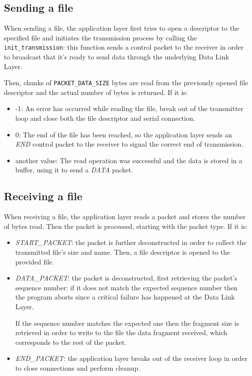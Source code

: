 \documentclass[11pt,a4paper,twocolumn]{article}
\begin{document}
\subsection{Sending a file}

When sending a file, the application layer first tries to open a descriptor to the specified file and initiates the transmission process by calling the \lstinline{init_transmission}: this function sends a control packet to the receiver in order to broadcast that it's ready to send data through the underlying Data Link Layer.

Then, chunks of \lstinline{PACKET_DATA_SIZE} bytes are read from the previously opened file descriptor and the actual number of bytes is returned. If it is:
\begin{itemize}
    \item -1: An error has occurred while reading the file, break out of the transmitter loop and close both the file descriptor and serial connection.

    \item 0: The end of the file has been reached, so the application layer sends an \textit{END} control packet to the receiver to signal the correct end of transmission.

    \item another value: The read operation was successful and the data is stored in a buffer, using it to send a \textit{DATA} packet.
\end{itemize}

\subsection{Receiving a file}

When receiving a file, the application layer reads a packet and stores the number of bytes read. Then the packet is processed, starting with the packet type. If it is:
\begin{itemize}
    \item \textit{START\_PACKET}: the packet is further deconstructed in order to collect the transmitted file's size and name. Then, a file descriptor is opened to the provided file.

    \item \textit{DATA\_PACKET}: the packet is deconstructed, first retrieving the packet's sequence number: if it does not match the expected sequence number then the program aborts since a critical failure has happened at the Data Link Layer.

          If the sequence number matches the expected one then the fragment size is retrieved in order to write to the file the data fragment received, which corresponds to the rest of the packet.

    \item \textit{END\_PACKET}: the application layer breaks out of the receiver loop in order to close connections and perform cleanup.
\end{itemize}
\end{document}
